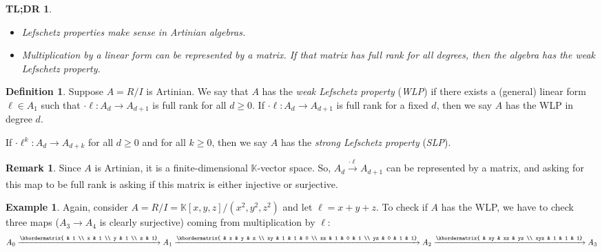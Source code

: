 \documentclass[12pt,a4paper]{article}
\newcommand{\KK}{\mathbb{K}}
\newtheorem*{tldr}{TL;DR}
\theoremstyle{definition}
\newtheorem{definition}[theorem]{Definition}
\newtheorem{remark}[theorem]{Remark}
\newtheorem{example}[theorem]{Example}
\numberwithin{equation}{section}
\begin{document}
\vspace*{2.5cm}

\begin{tldr}
    \phantom{ }
    \begin{itemize}
        \item Lefschetz properties make sense in Artinian algebras.

        \item Multiplication by a linear form can be represented by a matrix.
        If that matrix has full rank for all degrees, then the algebra has the \emph{weak Lefschetz property}.
    \end{itemize}
\end{tldr}

\newpage
\begin{definition}
    Suppose $A = R/I$ is Artinian.
    We say that $A$ has the \emph{weak Lefschetz property} (\emph{WLP}) if there exists a (general) linear form $\ell \in A_1$ such that $\cdot \ell \colon A_d \to A_{d+1}$ is full rank for all $d \geq 0$.
    If $\cdot \ell \colon A_d \to A_{d+1}$ is full rank for a fixed $d$, then we say $A$ has the WLP in degree $d$.
    
    If $\cdot \ell^k \colon A_d \to A_{d+k}$ for all $d \geq 0$ and for all $k \geq 0$, then we say $A$ has the \emph{strong Lefschetz property} (\emph{SLP}).
\end{definition}

\begin{remark}
    Since $A$ is Artinian, it is a finite-dimensional $\KK$-vector space.
    So, $A_d \xrightarrow[]{\cdot \ell} A_{d+1}$ can be represented by a matrix, and asking for this map to be full rank is asking if this matrix is either injective or surjective.
\end{remark}

\begin{example}
    Again, consider $A = R/I = \KK[x,y,z]/(x^2, y^2, z^2)$ and let $\ell = x + y + z$.
    To check if $A$ has the WLP, we have to check three maps ($A_3 \to A_4$ is clearly surjective) coming from multiplication by $\ell$:
    \begin{equation*}
        A_0 \xrightarrow[]{\kbordermatrix{ & 1 \\ x & 1 \\ y & 1 \\ z & 1}} A_1
        \xrightarrow[]{\kbordermatrix{ & x & y & z \\ xy & 1 & 1 & 0 \\ xz & 1 & 0 & 1 \\ yz & 0 & 1 & 1}} A_2
        \xrightarrow[]{\kbordermatrix{ & xy & xz & yz \\ xyz & 1 & 1 & 1}} A_3
    \end{equation*}
\end{example}
\end{document}
